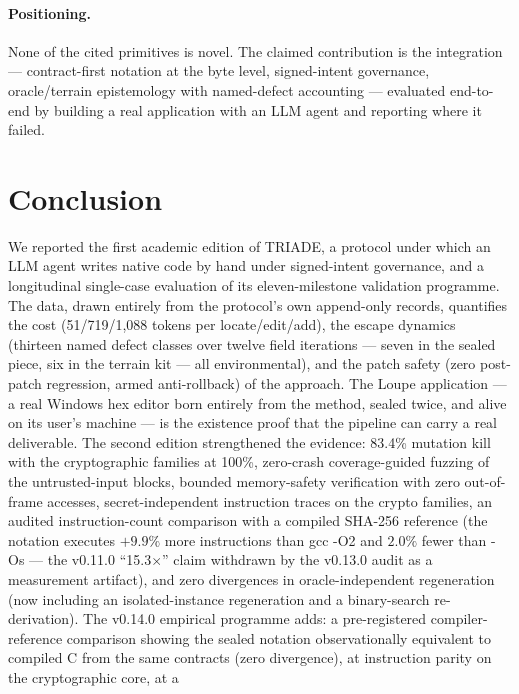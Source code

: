 \documentclass[11pt,a4paper]{article}
\begin{document}
\paragraph{Positioning.} None of the cited primitives is novel. The
claimed contribution is the integration --- contract-first notation at
the byte level, signed-intent governance, oracle/terrain epistemology
with named-defect accounting --- evaluated end-to-end by building a real
application with an LLM agent and reporting where it failed.

\section{Conclusion}\label{sec:conclusion}

We reported the first academic edition of TRIADE, a protocol under which
an LLM agent writes native code by hand under signed-intent governance,
and a longitudinal single-case evaluation of its eleven-milestone
validation programme. The data, drawn entirely from the protocol's own
append-only records, quantifies the cost (51/719/1{,}088 tokens per
locate/edit/add), the escape dynamics (thirteen named defect classes over
twelve field iterations --- seven in the sealed piece, six in the
terrain kit --- all environmental), and the patch safety (zero
post-patch regression, armed anti-rollback) of the approach. The Loupe
application --- a real Windows hex editor born entirely from the method,
sealed twice, and alive on its user's machine --- is the existence proof
that the pipeline can carry a real deliverable. The second edition strengthened the
evidence: 83.4\% mutation kill with the cryptographic families at
100\%, zero-crash coverage-guided fuzzing of the untrusted-input blocks,
bounded memory-safety verification with zero out-of-frame accesses,
secret-independent instruction traces on the crypto families, an audited
instruction-count comparison with a compiled SHA-256 reference (the
notation executes $+9.9\%$ more instructions than gcc -O2 and $2.0\%$
fewer than -Os --- the v0.11.0 ``15.3$\times$''
claim withdrawn by the v0.13.0 audit as a measurement artifact), and zero divergences in oracle-independent regeneration (now including an
isolated-instance regeneration and a binary-search re-derivation). The v0.14.0 empirical programme
adds: a pre-registered compiler-reference comparison showing the sealed
notation observationally equivalent to compiled C from the same contracts
(zero divergence), at instruction parity on the cryptographic core, at a
\end{document}
